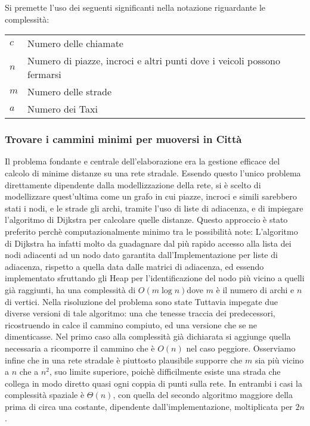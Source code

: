 \documentclass[a4paper,11pt]{Article}
\begin{document}
Si premette l'uso dei seguenti significanti nella notazione riguardante le complessità:

\begin{tabular}{p{1.75cm}p{10cm}p{1cm}}
$c$ & Numero delle chiamate \\
$n$ & Numero di piazze, incroci e altri punti dove i veicoli possono fermarsi\\
$m$ & Numero delle strade\\
$a$ & Numero dei Taxi \\
\end{tabular}

\subsubsection{Trovare i cammini minimi per muoversi in Città}

Il problema fondante e centrale dell'elaborazione era la gestione efficace del calcolo di minime distanze su una rete stradale. Essendo questo l'unico problema direttamente dipendente dalla modellizzazione della rete, si è scelto di modellizzare quest'ultima come un grafo in cui piazze, incroci e simili sarebbero stati i nodi, e le strade gli archi, tramite l'uso di liste di adiacenza, e di impiegare l'algoritmo di Dijkstra per calcolare quelle distanze. Questo approccio è stato preferito perchè computazionalmente minimo tra le possibilità note: L'algoritmo di Dijkstra ha infatti molto da guadagnare dal più rapido accesso alla lista dei nodi adiacenti ad un nodo dato garantita dall'Implementazione per liste di adiacenza, rispetto a quella data dalle matrici di adiacenza, ed essendo implementato sfruttando gli Heap per l'identificazione del nodo più vicino a quelli già raggiunti, ha una complessità di $O(m\log{n})$dove $m$ è il numero di archi e $n$ di vertici.
Nella risoluzione del problema sono state Tuttavia impegate due diverse versioni di tale algoritmo: una che tenesse traccia dei predecessori, ricostruendo in calce il cammino compiuto, ed una versione che se ne dimenticasse.
Nel primo caso alla complessità già dichiarata si aggiunge quella necessaria a ricomporre il cammino che è $O(n)$ nel caso peggiore.
Osserviamo infine che in una rete stradale è piuttosto plausibile supporre che $m$ sia più vicino a $n$ che a $n^2$, suo limite superiore, poichè difficilmente esiste una strada che collega in modo diretto quasi ogni coppia di punti sulla rete.
In entrambi i casi la complessità spaziale è $\Theta(n)$, con quella del secondo algoritmo maggiore della prima di circa una costante, dipendente dall'implementazione, moltiplicata per $2n$.
\end{document}
